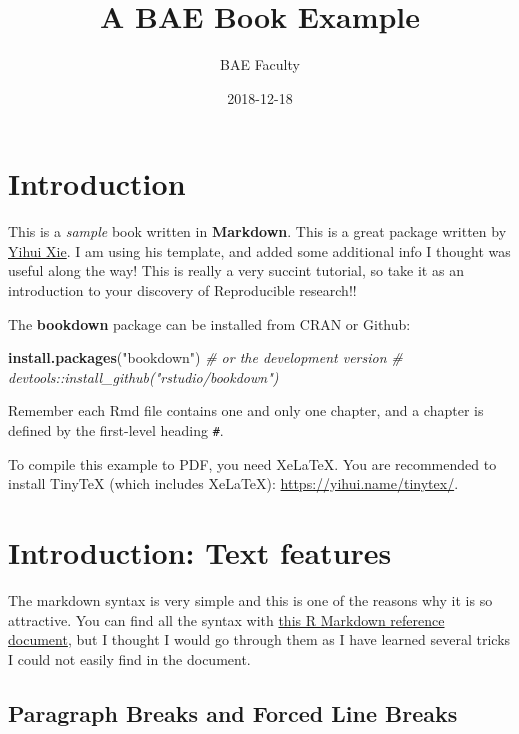 \documentclass[]{book}
\title{A BAE Book Example}
\author{BAE Faculty}
\date{2018-12-18}
\newenvironment{Shaded}{\begin{snugshade}}{\end{snugshade}}
\newcommand{\KeywordTok}[1]{\textcolor[rgb]{0.13,0.29,0.53}{\textbf{#1}}}
\newcommand{\StringTok}[1]{\textcolor[rgb]{0.31,0.60,0.02}{#1}}
\newcommand{\CommentTok}[1]{\textcolor[rgb]{0.56,0.35,0.01}{\textit{#1}}}
\newcommand{\NormalTok}[1]{#1}
\theoremstyle{definition}
\theoremstyle{definition}
\theoremstyle{definition}
\theoremstyle{remark}
\begin{document}
\maketitle

{
\setcounter{tocdepth}{1}
\tableofcontents
}
\chapter{Introduction}\label{introduction}

This is a \emph{sample} book written in \textbf{Markdown}. This is a
great package written by
\href{https://bookdown.org/yihui/bookdown/}{Yihui Xie}. I am using his
template, and added some additional info I thought was useful along the
way! This is really a very succint tutorial, so take it as an
introduction to your discovery of Reproducible research!!

The \textbf{bookdown} package can be installed from CRAN or Github:

\begin{Shaded}
\begin{Highlighting}[]
\KeywordTok{install.packages}\NormalTok{(}\StringTok{"bookdown"}\NormalTok{)}
\CommentTok{# or the development version}
\CommentTok{# devtools::install_github("rstudio/bookdown")}
\end{Highlighting}
\end{Shaded}

Remember each Rmd file contains one and only one chapter, and a chapter
is defined by the first-level heading \texttt{\#}.

To compile this example to PDF, you need XeLaTeX. You are recommended to
install TinyTeX (which includes XeLaTeX):
\url{https://yihui.name/tinytex/}.

\chapter{Introduction: Text features}\label{intro}

The markdown syntax is very simple and this is one of the reasons why it
is so attractive. You can find all the syntax with
\href{https://www.rstudio.com/wp-content/uploads/2015/03/rmarkdown-reference.pdf}{this
R Markdown reference document}, but I thought I would go through them as
I have learned several tricks I could not easily find in the document.

\section{Paragraph Breaks and Forced Line
Breaks}\label{paragraph-breaks-and-forced-line-breaks}
\end{document}
